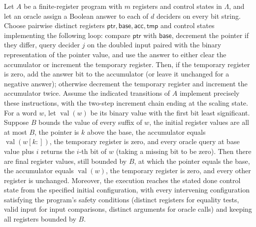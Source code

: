 \begin{theorem}
\label{Complexity.LogProg.boundedDecode_loop}
\leanok
{}
Let $A$ be a finite-register program with $m$ registers and control states in $\Lambda$,
and let an oracle assign a Boolean answer to each of $d$ deciders on every bit string.
Choose pairwise distinct registers
$\mathsf{ptr},\mathsf{base},\mathsf{acc},\mathsf{tmp}$ and control states implementing
the following loop: compare $\mathsf{ptr}$ with $\mathsf{base}$, decrement the pointer
if they differ, query decider $j$ on the doubled input paired with the binary
representation of the pointer value, and use the answer to either clear the accumulator
or increment the temporary register. Then, if the temporary register is zero, add the
answer bit to the accumulator (or leave it unchanged for a negative answer); otherwise
decrement the temporary register and increment the accumulator twice. Assume the
indicated transitions of $A$ implement precisely these instructions, with the two-step
increment chain ending at the scaling state. For a word $w$, let $\operatorname{val}(w)$
be its binary value with the first bit least significant. Suppose $B$ bounds the value
of every suffix of $w$, the initial register values are all at most $B$, the pointer is
$k$ above the base, the accumulator equals $\operatorname{val}(w[k:])$, the temporary
register is zero, and every oracle query at base value plus $i$ returns the $i$-th bit
of $w$ (taking a missing bit to be zero). Then there are final register values, still
bounded by $B$, at which the pointer equals the base, the accumulator equals
$\operatorname{val}(w)$, the temporary register is zero, and every other register is
unchanged. Moreover, the execution reaches the stated done control state from the
specified initial configuration, with every intervening configuration satisfying the
program’s safety conditions (distinct registers for equality tests, valid input for
input comparisons, distinct arguments for oracle calls) and keeping all registers
bounded by $B$.
\end{theorem}

